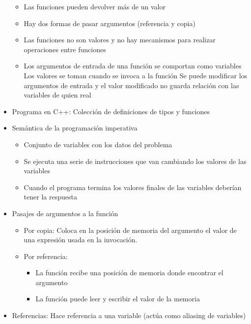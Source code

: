 \documentclass[a4paper,10pt]{article}
\begin{document}
\begin{itemize}
	\begin{itemize}
	    \item Las funciones pueden devolver más de un valor
	    \item Hay dos formas de pasar argumentos (referencia y copia)
	    \item Las funciones no son valores y no hay mecanismos para realizar operaciones entre funciones
	    \item Los argumentos de entrada de una función se comportan como variables
	    \subitem Los valores se toman cuando se invoca a la función
	    \subitem Se puede modificar los argumentos de entrada y el valor modificado no guarda relación con las variables de quien real
	\end{itemize}
	\item Programa en C++: Colección de definiciones de tipos y funciones
	\item Semántica de la programación imperativa
	\begin{itemize}
	    \item Conjunto de variables con los datos del problema
	    \item Se ejecuta una serie de instrucciones que van cambiando los valores de las variables
	    \item Cuando el programa termina los valores finales de las variables deberían tener la respuesta
	\end{itemize}
	\item Pasajes de argumentos a la función
	\begin{itemize}
	    \item Por copia: Coloca en la posición de memoria del argumento el valor de una expresión usada en la invocación.
	    \item Por referencia: 
	    \begin{itemize}
		\item La función recibe una posición de memoria donde encontrar el argumento
		\item La función puede leer y escribir el valor de la memoria 
	    \end{itemize}
	\end{itemize}
	\item Referencias: Hace referencia a una variable (actúa como aliasing de variables)
    \end{itemize}
\end{document}
